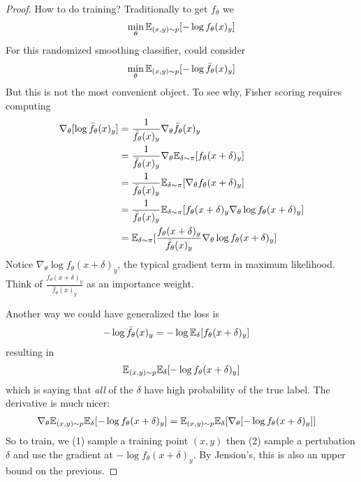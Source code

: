 \begin{proof}
  How to do training? Traditionally to get $f_\theta$ we
  \begin{align}
    \min_\theta \mathbb{E}_{(x,y) \sim p}[ -\log f_\theta(x)_y]
  \end{align}
  For this randomized smoothing classifier, could consider
  \begin{align}
    \min_\theta \mathbb{E}_{(x,y) \sim p}[ -\log \bar{f}_\theta(x)_y]
  \end{align}
  But this is not the most convenient object. To see why,
  Fisher scoring requires computing
  \begin{align}
    \nabla_\theta [ \log \bar{f}_\theta(x)_y ]
    &= \frac{1}{\bar{f}_\theta(x)_y} \nabla_\theta \bar{f}_\theta(x)_y \\
    &= \frac{1}{\bar{f}_\theta(x)_y} \nabla_\theta \mathbb{E}_{\delta \sim \pi}[ f_\theta(x+\delta)_y] \\
    &= \frac{1}{\bar{f}_\theta(x)_y} \mathbb{E}_{\delta \sim \pi}[
    \nabla_\theta f_\theta(x+\delta)_y
    ] \\
    &= \frac{1}{\bar{f}_\theta(x)_y} \mathbb{E}_{\delta \sim \pi}[
    f_\theta(x+\delta)_y
    \nabla_\theta \log f_\theta(x+\delta)_y
    ] \\
    &= \mathbb{E}_{\delta \sim \pi}[
    \frac{f_\theta(x+\delta)_y}{\bar{f}_\theta(x)_y}
    \nabla_\theta \log f_\theta(x+\delta)_y
    ]
  \end{align}
  Notice $\nabla_\theta \log f_\theta(x+\delta)_y$, the typical gradient term
  in maximum likelihood. Think of
  $\frac{f_\theta(x+\delta)_y}{\bar{f}_\theta(x)_y}$ as an importance weight.

  Another way we could have generalized the loss is
  \begin{align}
    -\log \bar{f}_\theta(x)_y
    &= -\log \mathbb{E}_\delta[f_\theta(x+\delta)_y]
  \end{align}
  resulting in
  \begin{align}
    \mathbb{E}_{(x,y) \sim p} \mathbb{E}_\delta[-\log f_\theta(x+\delta)_y]
  \end{align}
  which is saying that \emph{all} of the $\delta$ have high probability
  of the true label. The derivative is much nicer:
  \begin{align}
    \nabla_\theta
    \mathbb{E}_{(x,y) \sim p} \mathbb{E}_\delta[-\log f_\theta(x+\delta)_y]
    &=
    \mathbb{E}_{(x,y) \sim p} \mathbb{E}_\delta[\nabla_\theta[-\log f_\theta(x+\delta)_y]]
  \end{align}
  So to train, we
  (1) sample a training point $(x,y)$ then
  (2) sample a pertubation $\delta$ and use
  the gradient at $-\log f_\theta(x+\delta)_y$.
  By Jension's, this is also an upper bound on the previous.
\end{proof}

